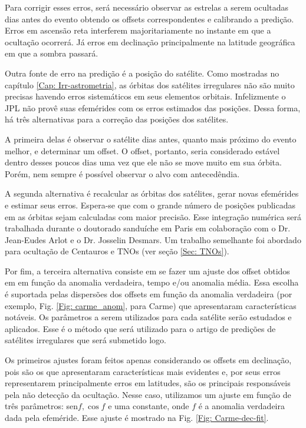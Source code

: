 \documentclass[12pt,a4paper]{monografia}
\begin{document}
Para corrigir esses erros, será necessário observar as estrelas a serem ocultadas dias antes do evento obtendo os offsets correspondentes e calibrando a predição. Erros em ascensão reta interferem majoritariamente no instante em que a ocultação ocorrerá. Já erros em declinação principalmente na latitude geográfica em que a sombra passará.

Outra fonte de erro na predição é a posição do satélite. Como mostradas no capítulo \ref{Cap: Irr-astrometria}, as órbitas dos satélites irregulares não são muito precisas havendo erros sistemáticos em seus elementos orbitais. Infelizmente o JPL não provê suas efemérides com os erros estimados das posições. Dessa forma, há três alternativas para a correção das posições dos satélites.

A primeira delas é observar o satélite dias antes, quanto mais próximo do evento melhor, e determinar um offset. O offset, portanto, seria considerado estável dentro desses poucos dias uma vez que ele não se move muito em sua órbita. Porém, nem sempre é possível observar o alvo com antecedêndia.

A segunda alternativa é recalcular as órbitas dos satélites, gerar novas efemérides e estimar seus erros. Espera-se que com o grande número de posições publicadas em \cite{GomesJunior2015-Irregular} as órbitas sejam calculadas com maior precisão. Esse integração numérica será trabalhada durante o doutorado sanduíche em Paris em colaboração com o Dr. Jean-Eudes Arlot e o Dr. Josselin Desmars. Um trabalho semelhante foi abordado para ocultação de Centauros e TNOs (ver seção \ref{Sec: TNOs}).

Por fim, a terceira alternativa consiste em se fazer um ajuste dos offset obtidos em \cite{GomesJunior2015-Irregular} em função da anomalia verdadeira, tempo e/ou anomalia média. Essa escolha é suportada pelas dispersões dos offsets em função da anomalia verdadeira (por exemplo, Fig. \ref{Fig: carme_anom}, para Carme) que apresentaram características notáveis. Os parâmetros a serem utilizados para cada satélite serão estudados e aplicados. Esse é o método que será utilizado para o artigo de predições de satélites irregulares que será submetido logo.

Os primeiros ajustes foram feitos apenas considerando os offsets em declinação, pois são os que apresentaram características mais evidentes e, por seus erros representarem principalmente erros em latitudes, são os principais responsáveis pela não detecção da ocultação. Nesse caso, utilizamos um ajuste em função de três parâmetros: sen${f}, \cos{f}$ e uma constante, onde $f$ é a anomalia verdadeira dada pela efeméride. Esse ajuste é mostrado na Fig. \ref{Fig: Carme-dec-fit}.
\end{document}
